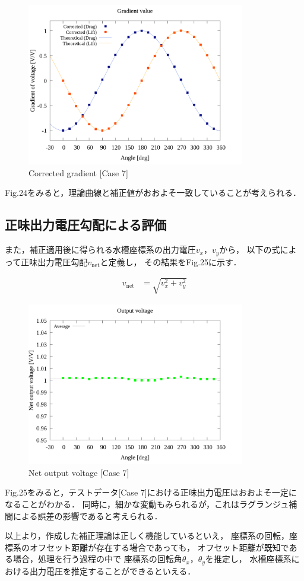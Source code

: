 \begin{figure}[htbp]
  \begin{center}
    \includegraphics[width=95mm]{../../02_workspace/result/simulation_tx=10.0_ty=-5.0_dx=5.00_dy=-2.50/plot/21/21-4_summary.png}
    \caption{Corrected gradient [Case 7]}
  \end{center}
\end{figure}

Fig.24をみると，理論曲線と補正値がおおよそ一致していることが考えられる．

\subsection{正味出力電圧勾配による評価}

また，補正適用後に得られる水槽座標系の出力電圧$v_x$，$v_y$から，
以下の式によって正味出力電圧勾配$v_{\mathrm{net}}$と定義し，
その結果をFig.25に示す．

\begin{align}
  v_{\mathrm{net}} & = \sqrt{v_x^2 + v_y^2}
\end{align}

\begin{figure}[htbp]
  \begin{center}
    \includegraphics[width=95mm]{../../02_workspace/result/simulation_tx=10.0_ty=-5.0_dx=5.00_dy=-2.50/plot/09/09_summary-outputvoltage-net.png}
    \caption{Net output voltage [Case 7]}
  \end{center}
\end{figure}

Fig.25をみると，テストデータ[Case 7]における正味出力電圧はおおよそ一定になることがわかる．
同時に，細かな変動もみられるが，これはラグランジュ補間による誤差の影響であると考えられる．

以上より，作成した補正理論は正しく機能しているといえ，
座標系の回転，座標系のオフセット距離が存在する場合であっても，
オフセット距離が既知である場合，処理を行う過程の中で
座標系の回転角$\theta_x$，$\theta_y$を推定し，
水槽座標系における出力電圧を推定することができるといえる．

\newpage